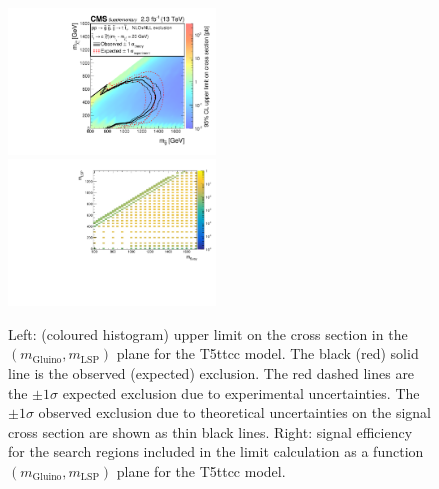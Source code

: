 \clearpage
\begin{figure}[t]
  \begin{center}
    \includegraphics[width=0.49\textwidth]{supplementary/figures/RA1T5ttccXSEC} \, 
    \includegraphics[width=0.49\textwidth]{supplementary/figures/T5ttcc_merging_4_cats} \,     
  \end{center}
  \caption{Left: (coloured histogram) upper limit on the cross section in the $(m_{\mathrm{Gluino}},m_{\mathrm{LSP}})$ plane for the T5ttcc model. 
  The black (red) solid line is the observed (expected) exclusion. The red dashed lines are the $\pm1\sigma$ expected exclusion due to experimental uncertainties. 
  The $\pm1\sigma$ observed exclusion due to theoretical uncertainties on the signal cross section are shown as thin black lines. 
  Right: signal efficiency for the search regions included in the limit calculation as a function $(m_{\mathrm{Gluino}},m_{\mathrm{LSP}})$ plane for the T5ttcc model. 
  \label{fig:T5ttcc_excl}}
\end{figure}

